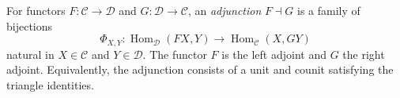 
For functors $F:\mathcal C\to\mathcal D$ and $G:\mathcal D\to\mathcal C$, an \emph{adjunction} $F\dashv G$ is a family of bijections
\[
\Phi_{X,Y}:\operatorname{Hom}_{\mathcal D}(F X,Y)\longrightarrow\operatorname{Hom}_{\mathcal C}(X,G Y)
\]
natural in $X\in\mathcal C$ and $Y\in\mathcal D$. The functor $F$ is the left adjoint and $G$ the right adjoint. Equivalently, the adjunction consists of a unit and counit satisfying the triangle identities.

